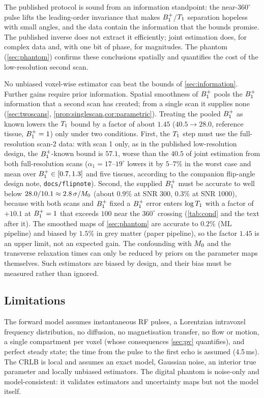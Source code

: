 The published protocol is sound from an information standpoint: the near-$360^\circ$ pulse lifts
the leading-order invariance that makes $B_1^{+}$/$T_1$ separation hopeless with small angles, and the
data contain the information that the bounds promise. The published inverse does not extract
it efficiently; joint estimation does, for complex data and, with one bit of phase, for
magnitudes. The phantom (\cref{sec:phantom}) confirms these conclusions spatially and
quantifies the cost of the low-resolution second scan.

No unbiased voxel-wise estimator can beat the bounds of \cref{sec:information}. Further gains
require prior information. Spatial smoothness of $B_1^{+}$ pools the $B_1^{+}$ information that a second
scan has created; from a single scan it supplies none (\cref{sec:twoscans}, \cref{prop:singlescan,cor:parametric}).
Treating the pooled $B_1^{+}$ as known lowers the $T_1$ bound by a factor of about $1.45$ ($40.5\to28.0$,
reference tissue, $B_1^{+}=1$) only under two conditions. First, the $T_1$ step must use the
full-resolution scan-2 data: with scan 1 only, as in the published low-resolution design, the
$B_1^{+}$-known bound is $57.1$, worse than the $40.5$ of joint estimation from both full-resolution
scans ($\alpha_1=17$--$19^\circ$ lowers it by $5$--$7\%$ in the worst case and mean over $B_1^{+}\in[0.7,1.3]$ and
five tissues, according to the companion flip-angle design note, \texttt{docs/flipnote}). Second, the supplied $B_1^{+}$ must be accurate to well
below $28.0/10.1\approx2.8\,\sigma/M_0$ (about $0.9\%$ at SNR 300, $0.3\%$ at SNR 1000), because with both scans
and $B_1^{+}$ fixed a $B_1^{+}$ error enters $\log T_1$ with a factor of $+10.1$ at $B_1^{+}=1$ that exceeds $100$ near
the $360^\circ$ crossing (\cref{tab:cond} and the text after it). The smoothed maps of \cref{sec:phantom}
are accurate to $0.2\%$ (ML pipeline) and biased by $1.5\%$ in grey matter (paper pipeline), so the
factor $1.45$ is an upper limit, not an expected gain. The confounding with $M_0$ and the
transverse relaxation times can only be reduced by priors on the parameter maps themselves.
Such estimators are biased by design, and their bias must be measured rather than ignored.

\subsection{Limitations}

The forward model assumes instantaneous RF pulses, a Lorentzian intravoxel frequency
distribution, no diffusion, no magnetisation transfer, no flow or motion, a single
compartment per voxel (whose consequences \cref{sec:pv} quantifies), and perfect steady state; the time from the pulse to the first echo
is assumed (4.5\,ms). The CRLB is local and assumes an exact model, Gaussian noise, an interior
true parameter and locally unbiased estimators. The digital phantom is noise-only and
model-consistent: it validates estimators and uncertainty maps but not the model itself.

